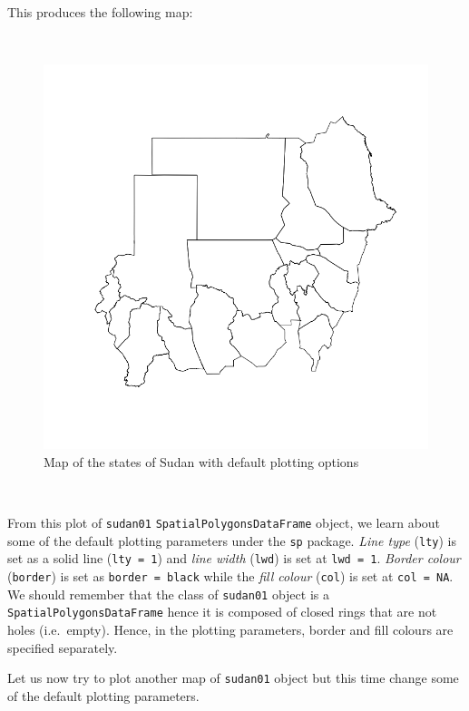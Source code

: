 \documentclass[12pt,a4paper,a4paper]{book}
\theoremstyle{definition}
\theoremstyle{definition}
\theoremstyle{definition}
\theoremstyle{remark}
\begin{document}
\newpage

This produces the following map:

~

\begin{figure}[H]

{\centering \includegraphics{figures/map1-1} 

}

\caption{Map of the states of Sudan with default plotting options}\label{fig:map1}
\end{figure}

~

From this plot of \texttt{sudan01} \texttt{SpatialPolygonsDataFrame}
object, we learn about some of the default plotting parameters under the
\texttt{sp} package. \emph{Line type} (\texttt{lty}) is set as a solid
line (\texttt{lty\ =\ 1}) and \emph{line width} (\texttt{lwd}) is set at
\texttt{lwd\ =\ 1}. \emph{Border colour} (\texttt{border}) is set as
\texttt{border\ =\ black} while the \emph{fill colour} (\texttt{col}) is
set at \texttt{col\ =\ NA}. We should remember that the class of
\texttt{sudan01} object is a \texttt{SpatialPolygonsDataFrame} hence it
is composed of closed rings that are not holes (i.e.~empty). Hence, in
the plotting parameters, border and fill colours are specified
separately.

Let us now try to plot another map of \texttt{sudan01} object but this
time change some of the default plotting parameters.
\end{document}
